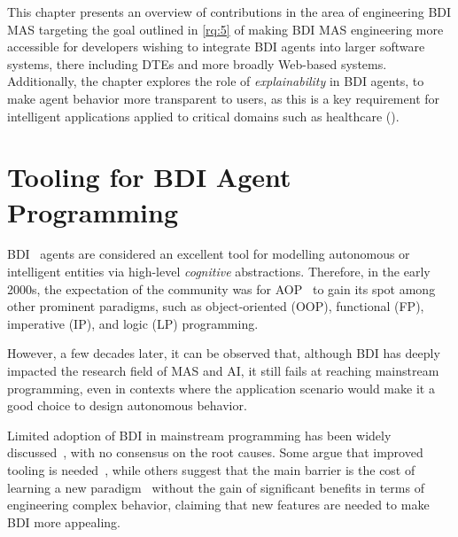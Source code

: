 This chapter presents an overview of contributions in the area of engineering \ac{BDI} \ac{MAS} targeting the goal outlined in \ref{rq:5} of making \ac{BDI} \ac{MAS} engineering more accessible for developers wishing to integrate \ac{BDI} agents into larger software systems, there including \acp{DTE} and more broadly Web-based systems.
%
Additionally, the chapter explores the role of \emph{explainability} in \ac{BDI} agents, to make agent behavior more transparent to users, as this is a key requirement for intelligent applications applied to critical domains such as healthcare ().

\section{Tooling for \acs{BDI} Agent Programming}
\label{sec:mas:engineering:jakta}

\ac{BDI}~\cite{rao1991modeling} agents are considered
an excellent tool for modelling autonomous or intelligent entities
via high-level \emph{cognitive} abstractions.
%
Therefore, in the early 2000s, the expectation of the community was for \ac{AOP}~\cite{Shoham_1993} to gain its spot among other prominent paradigms,
such as object-oriented (\acs{OOP}), functional (\acs{FP}), imperative (\acs{IP}), and logic (\acs{LP}) programming.

However,
a few decades later,
it can be observed that,
although \ac{BDI} has deeply impacted the research field of \ac{MAS} and \ac{AI},
it still fails at reaching mainstream programming,
even in contexts where the application scenario would make it
a good choice to design autonomous behavior.

Limited adoption of \ac{BDI} in mainstream programming has been widely discussed~\cite{lind2000aose,DBLP:journals/sigsoft/MascardiWR19,DBLP:journals/ijaose/DignumD10,DBLP:books/sp/14/Muller014,DBLP:journals/corr/abs-1209-1428}, with no consensus on the root causes.
%
Some argue that improved tooling is needed~\cite{DBLP:conf/dalt/Hindriks14},
while others suggest that the main barrier is the cost of learning a new paradigm~\cite{DBLP:journals/ijaose/Logan18} without the gain of significant benefits in terms of engineering complex behavior, claiming that new features are needed to make \ac{BDI} more appealing.

